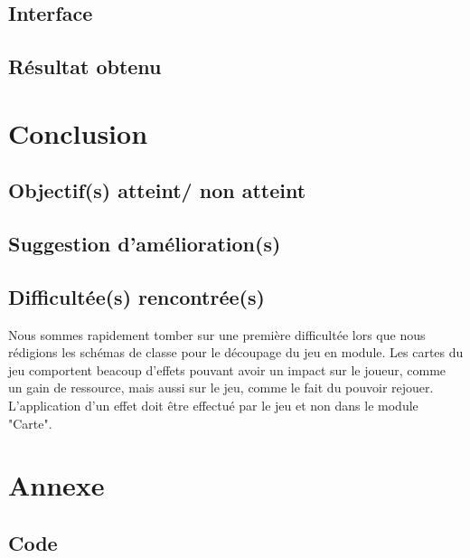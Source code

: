 \documentclass[a4paper, 12pt, french]{article}
\begin{document}
	\subsection{Interface}
	\subsection{Résultat obtenu}

	\section{Conclusion}
	\subsection{Objectif(s) atteint/ non atteint}
	\subsection{Suggestion d'amélioration(s)}
	\subsection{Difficultée(s) rencontrée(s)}
	Nous sommes rapidement tomber sur une première difficultée lors que nous rédigions les schémas de classe pour le
	découpage du jeu en module. Les cartes du jeu comportent beacoup d'effets pouvant avoir un impact sur le joueur,
	comme un gain de ressource, mais aussi sur le jeu, comme le fait du pouvoir rejouer. L'application d'un effet
	doit être effectué par le jeu et non dans le module "Carte". %

	\section{Annexe}
	\subsection{Code}

	\printbibliography
\end{document}
